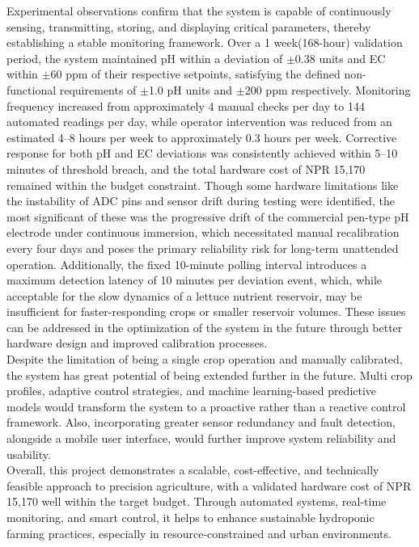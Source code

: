 Experimental observations confirm that the system is capable of continuously sensing, transmitting, storing, and displaying critical parameters, thereby establishing a stable monitoring framework. Over a 1 week(168-hour) validation period, the system maintained pH within a deviation of $\pm$0.38 units and EC within $\pm$60 ppm of their respective setpoints, satisfying the defined non-functional requirements of $\pm$1.0 pH units and $\pm$200 ppm respectively. Monitoring frequency increased from approximately 4 manual checks per day to 144 automated readings per day, while operator intervention was reduced from an estimated 4--8 hours per week to approximately 0.3 hours per week. Corrective response for both pH and EC deviations was consistently achieved within 5--10 minutes of threshold breach, and the total hardware cost of NPR 15,170 remained within the budget constraint. Though some hardware limitations like the instability of ADC pins and sensor drift during testing were identified, the most significant of these was the progressive drift of the commercial pen-type pH electrode under continuous immersion, which necessitated manual recalibration every four days and poses the primary reliability risk for long-term unattended operation. Additionally, the fixed 10-minute polling interval introduces a maximum detection latency of 10 minutes per deviation event, which, while acceptable for the slow dynamics of a lettuce nutrient reservoir, may be insufficient for faster-responding crops or smaller reservoir volumes. These issues can be addressed in the optimization of the system in the future through better hardware design and improved calibration processes.\\[10pt]
Despite the limitation of being a single crop operation and manually calibrated, the system has great potential of being extended further in the future. Multi crop profiles, adaptive control strategies, and machine learning-based predictive models would transform the system to a proactive rather than a reactive control framework. Also, incorporating greater sensor redundancy and fault detection, alongside a mobile user interface, would further improve system reliability and usability.\\[10pt]
Overall, this project demonstrates a scalable, cost-effective, and technically feasible approach to precision agriculture, with a validated hardware cost of NPR 15,170 well within the target budget. Through automated systems, real-time monitoring, and smart control, it helps to enhance sustainable hydroponic farming practices, especially in resource-constrained and urban environments.
